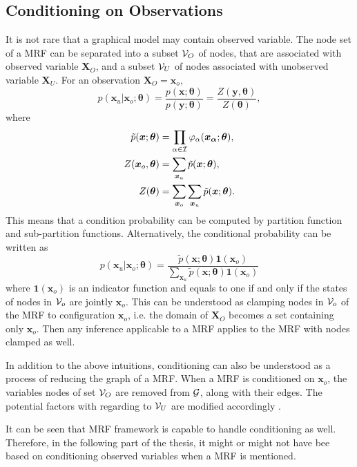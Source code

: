 \subsection{Conditioning on Observations}
It is not rare that a graphical model may contain observed variable. The node set of a MRF can be separated into a subset $\mathcal{V}_O$ of nodes, that are associated with observed variable $\bm{X}_O$, and a subset $\mathcal{V}_U$ of nodes associated with unobserved variable $\bm{X}_U$. For an observation $\bm{X}_O=\bm{x}_o$,
\begin{equation}
  p(\bm{x}_u|\bm{x}_o;\bm{\theta}) = \frac{p(\bm{x}; \bm{\theta})}{p(\bm{y};\bm{\theta})} =  \frac{Z(\bm{y},\bm{\theta})}{Z(\bm{\theta})},
\end{equation}
where 
\begin{align}
  \tilde{p}(\bm{x}; \bm{\theta}) &= \prod_{\alpha \in \mathcal{I}} \varphi_{\alpha}(\bm{x_{\alpha}};\bm{\theta}), \nonumber \\
  Z(\bm{x}_o, \bm{\theta}) &= \sum_{\bm{x}_u} \tilde{p}(\bm{x}; \bm{\theta}), \nonumber \\
  Z(\bm{\theta}) &= \sum_{\bm{x}_o}\sum_{\bm{x}_u} \tilde{p}(\bm{x}; \bm{\theta}).
\end{align}
This means that a condition probability can be computed by partition function and sub-partition functions. Alternatively, the conditional probability can be written as
\begin{equation}
  p(\bm{x}_u|\bm{x}_o;\bm{\theta}) = \frac{\tilde{p}(\bm{x}; \bm{\theta})\bm{1}(\bm{x}_o)}{\sum_{\bm{x}_u}\tilde{p}(\bm{x}; \bm{\theta})\bm{1}(\bm{x}_o)}
\end{equation}
where $\bm{1}(\bm{x}_o)$ is an indicator function and equals to one if and only if the states of nodes in $\mathcal{V}_o$ are jointly $\bm{x}_o$. This can be understood as clamping nodes in $\mathcal{V}_o$ of the MRF to configuration $\bm{x}_o$, i.e. the domain of $\bm{X}_O$ becomes a set containing only $\bm{x}_o$. Then any inference applicable to a MRF applies to the MRF with nodes clamped as well.

In addition to the above intuitions, conditioning can also be understood as a process of reducing the graph of a MRF. When a MRF is conditioned on $\bm{x}_o$, the variables nodes of set $\mathcal{V}_O$ are removed from $\mathcal{G}$, along with their edges. The potential factors with regarding to $\mathcal{V}_U$ are modified accordingly \cite[Chapter~4.2.3]{koller2009pgm}.

It can be seen that MRF framework is capable to handle conditioning as well. Therefore, in the following part of the thesis, it might or might not have bee based on conditioning observed variables when a MRF is mentioned.


